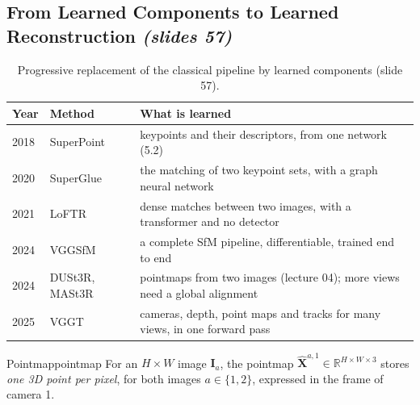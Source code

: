 \documentclass[11pt,a4paper]{article}
\newcommand{\slr}[1]{\texorpdfstring{\emph{(slides #1)}}{(slides #1)}}
\newcommand{\R}{\mathbb{R}}
\begin{document}
\subsection{From Learned Components to Learned Reconstruction \slr{57}}
\begin{table}[H]
\centering
\begin{tabular}{@{}llp{9.3cm}@{}}
\toprule
Year & Method & What is learned\\
\midrule
2018 & SuperPoint & keypoints and their descriptors, from one network (5.2)\\
2020 & SuperGlue & the matching of two keypoint sets, with a graph neural network\\
2021 & LoFTR & dense matches between two images, with a transformer and no detector\\
2024 & VGGSfM & a complete SfM pipeline, differentiable, trained end to end\\
2024 & DUSt3R, MASt3R & pointmaps from two images (lecture 04); more views need a global alignment\\
2025 & VGGT & cameras, depth, point maps and tracks for many views, in one forward pass\\
\bottomrule
\end{tabular}
\caption{Progressive replacement of the classical pipeline by learned components (slide 57).}
\end{table}

\begin{definition}{Pointmap}{pointmap}
For an $H\times W$ image $\bm I_a$, the pointmap $\hat{\bm X}^{a,1}\in\R^{H\times W\times3}$ stores \emph{one 3D point per pixel}, for both images $a\in\{1,2\}$, expressed in the frame of camera 1.
\end{definition}
\end{document}
